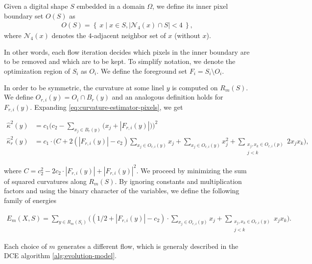 \documentclass[runningheads]{llncs}
\begin{document}
\begin{definition}
{
Given a digital shape $S$ embedded in a domain $\Omega$, we define its inner pixel boundary set $O(S)$ as
\begin{align*}
	O(S) = \left\{ \: x \; | \; x \in S, |\mathcal{N}_4(x) \cap S|<4 \: \right\},
\end{align*}
where $\mathcal{N}_4(x)$ denotes the $4$-adjacent neighbor set of $x$ (without $x$).
}
\end{definition}

In other words, each flow iteration decides which pixels in the inner boundary are to be removed and which are to be kept. To simplify notation, we denote the optimization region of $S_i$ as $O_i$. We define the foreground set $F_i = S_i \setminus O_i$.

In order to be symmetric, the curvature at some linel $y$ is computed on $R_m(S)$. We define $O_{r,i}(y) = O_i \cap B_r(y)$ and an analogous definition holds for $F_{r,i}(y)$. Expanding \eqref{eq:curvature-estimator-pixels}, we get 

	\begin{align*}
		\hat{\kappa}^2(y) &= c_1\Big( c_2 - \sum_{x_j \in B_r(y)} \big( {x_j} + |F_{r,i}(y)| \big) \Big)^2 \\
		\hat{\kappa}_{r}^2(y) &= c_1 \cdot \Big( C + 2\left( |F_{r,i}(y)| - c_2 \right) \sum_{x_j \in O_{r,i}(y)}{x_j} + \sum_{x_j \in O_{r,i}(y)}{x_j^2} + \sum_{ \substack{x_j,x_k \in O_{r,i}(p) \\ j<k} }{2x_jx_k}  \Big),
	\end{align*}
	
	where $C=c_2^2 - 2c_2 \cdot |F_{r,i}(y)| + |F_{r,i}(y)|^2$. We proceed by minimizing the sum of squared curvatures along $R_m(S)$. By ignoring constants and multiplication factors and using the binary character of the variables, we define the following family of energies
	
	\begin{align}
		E_m(X,S) = \sum_{y \in R_m(S_i)}{ \Big( { (1/2+ |F_{r,i}(y)|-c_2) \cdot \sum_{x_j \in O_{r,i}(y)}{x_j} } + \sum_{ \substack{x_j,x_k \in O_{r,i}(y) \\ j<k} }{x_jx_k} \Big) }.
		\label{eq:energy-family}
	\end{align}
	
	Each choice of $m$ generates a different flow, which is generaly described in the DCE algorithm \ref{alg:evolution-model}.
\end{document}
